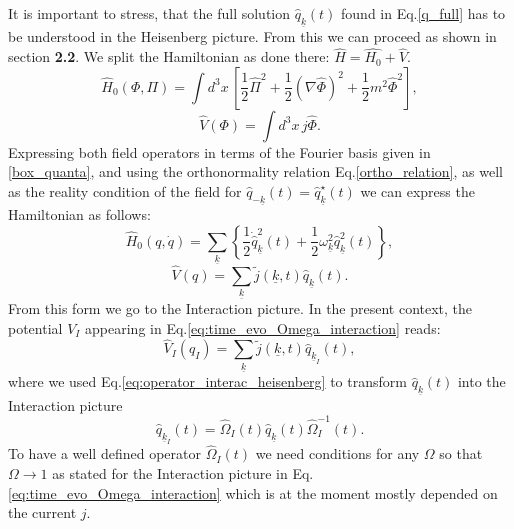 \documentclass[12pt, titlepage]{article}
\begin{document}
It is important to stress, that the full solution $  \hat{q}_{\underline{k}}(t) 
 $ found in Eq.\enskip\eqref{q_full} has to be understood in the Heisenberg picture.
 From this we can proceed as shown in section \textbf{2.2}.  
We split the Hamiltonian as done there: $ \hat{H}= \hat{H_0} +\hat{V} $. 
\begin{equation}
\hat{H}_{0}({\Phi},{\Pi})=
\int d^{3}x 
\,
\left[ 
\frac{1}{2}\hat{\Pi}^{2} + \frac{1}{2}(\nabla \hat{ \Phi})^{2} 
+\frac{1}{2}m^{2}\hat{\Phi}^{2}
\right] 
,
\end{equation}
\begin{equation}
\hat{V}(\Phi)=
\int d^{3}x 
\,
j\hat{\Phi}
.
\end{equation}
Expressing both field operators in terms of the Fourier basis given in \eqref{box_quanta}, and using the orthonormality relation Eq.\enskip\eqref{ortho_relation}, as well as the reality condition of the field for $ \hat{q}_{-\underline{k}}(t)=\hat{q}^{\star}_{\underline{k}}(t) $ we can express the Hamiltonian as follows:
\begin{equation}
\hat{H}_{0}({q},\dot{{q}})=
\sum_{\underline{k}}
\left\lbrace 
\frac{1}{2}\dot{\hat{q}}^{2}_{\underline{k}}(t)
+\frac{1}{2}\omega_{\underline{k}}^{2}\hat{q}^{2}_{\underline{k}}(t)
\right\rbrace 
,
\end{equation}
\begin{equation}
\hat{V}(q)=
\sum_{\underline{k}}
\tilde{j}(\underline{k},t)\hat{q}_{\underline{k}}(t).
\end{equation}
From this form we go to the Interaction picture. In the present context, the potential $ V_{I} $ appearing in Eq.\enskip\eqref{eq:time_evo_Omega_interaction} reads:
\begin{equation}
\hat{V}_{I}(q_{I})=
\sum_{\underline{k}}
\tilde{j}(\underline{k},t)\hat{q}_{\underline{k}_{I}}(t),
\end{equation}
where we used Eq.\enskip\eqref{eq:operator_interac_heisenberg} to transform $ \hat{q}_{\underline{k}}(t) $ into the Interaction picture
\begin{equation}
\hat{q}_{\underline{k}_{I}}(t)=
\hat{\Omega}_{I}(t)
\hat{q}_{\underline{k}}(t)
\hat{\Omega}_{I}^{-1}(t).
\end{equation}
To have a well defined operator $ \hat{\Omega}_{I}(t) $  we need conditions for any $ \Omega $ so that $\Omega \rightarrow 1 $ as stated for the Interaction picture in Eq.\enskip\eqref{eq:time_evo_Omega_interaction} which is at the moment mostly depended on the current $ j $.
%
%
%
%
\end{document}
